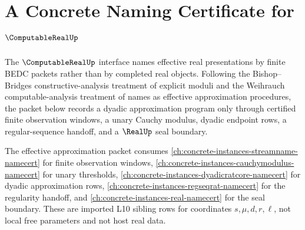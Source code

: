 \chapter{A Concrete Naming Certificate for $\ComputableRealUp$}
\label{ch:concrete-instances-computablereal-namecert}

The $\ComputableRealUp$ interface names effective real presentations by finite
BEDC packets rather than by completed real objects. Following the
Bishop--Bridges constructive-analysis treatment of explicit moduli and the
Weihrauch computable-analysis treatment of names as effective approximation
procedures, the packet below records a dyadic approximation program only
through certified finite observation windows, a unary Cauchy modulus, dyadic
endpoint rows, a regular-sequence handoff, and a $\RealUp$ seal boundary.

The effective approximation packet consumes
\autoref{ch:concrete-instances-streamname-namecert} for finite observation
windows, \autoref{ch:concrete-instances-cauchymodulus-namecert} for unary
thresholds, \autoref{ch:concrete-instances-dyadicratcore-namecert} for dyadic
approximation rows, \autoref{ch:concrete-instances-regseqrat-namecert} for
the regularity handoff, and
\autoref{ch:concrete-instances-real-namecert} for the seal boundary. These
are imported L10 sibling rows for coordinates $s,\mu,d,r,\ell$, not local
free parameters and not host real data.

